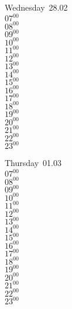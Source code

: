 \documentclass[11pt, a4paper]{book}\usepackage[]{graphicx}\usepackage[]{color}
\begin{document}
\begin{weekdaybox}
  Wednesday~28.02\\
  { 
  \vfill
  $07^{00}$\\
$08^{00}$\\
$09^{00}$\\
$10^{00}$\\
$11^{00}$\\
$12^{00}$\\
$13^{00}$\\
$14^{00}$\\
$15^{00}$\\
$16^{00}$\\
$17^{00}$\\
$18^{00}$\\
$19^{00}$\\
$20^{00}$\\
$21^{00}$\\
$22^{00}$\\
$23^{00}$\\
  }
\end{weekdaybox}
\clearpage
\begin{headerbox}
\end{headerbox}
\begin{weekdaybox}
  Thursday~01.03\\
  { 
  \vfill
  $07^{00}$\\
$08^{00}$\\
$09^{00}$\\
$10^{00}$\\
$11^{00}$\\
$12^{00}$\\
$13^{00}$\\
$14^{00}$\\
$15^{00}$\\
$16^{00}$\\
$17^{00}$\\
$18^{00}$\\
$19^{00}$\\
$20^{00}$\\
$21^{00}$\\
$22^{00}$\\
$23^{00}$\\
  }
\end{weekdaybox} 
\end{document}
